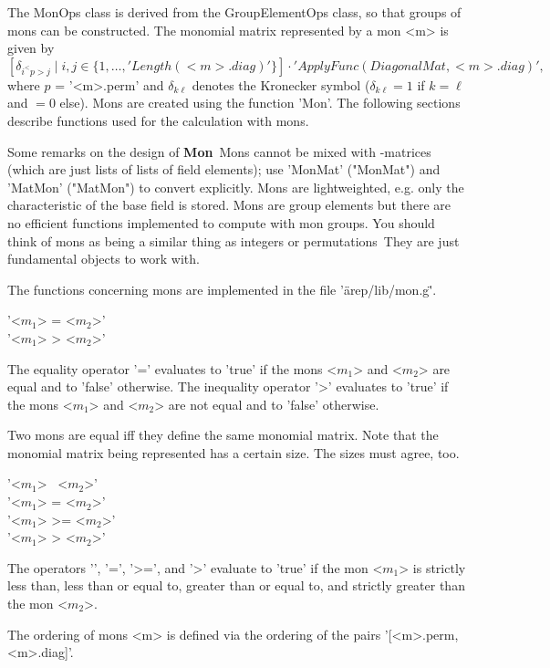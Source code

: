 The MonOps class is derived from the GroupElementOps class, 
so that groups of mons can be constructed. The monomial matrix
represented by a mon <m> is given by
$$
[\delta_{i^<p>j}\mid i,j\in\{1,\dots,'Length( <m>.diag )'\}]\cdot 
'ApplyFunc(DiagonalMat, <m>.diag )',
$$
where $p$ = '<m>.perm' and $\delta_{k\ell}$ denotes the 
Kronecker symbol ($\delta_{k\ell} = 1$ if $k = \ell$ and $= 0$ else). 
Mons are 
created using the function 'Mon'. The following sections describe 
functions used for the calculation with mons.

Some remarks on the design of {\bf Mon}\:\ Mons cannot be mixed 
with {\GAP}-matrices (which are just lists of lists of field
elements); use 'MonMat' ("MonMat") and 'MatMon' ("MatMon") to convert
explicitly. Mons are lightweighted, e.g. only the characteristic of
the base field is stored.  Mons are group elements but there are no
efficient functions implemented to compute with mon groups. You should
think of mons as being a similar thing as integers or permutations\:\
They are just fundamental objects to work with.

The functions concerning mons are implemented in the file 
'\"arep/lib/mon.g\"'.

\Section{Comparison of Mons}%
%

'<$m_1$> = <$m_2$>' \\
'<$m_1$> \<> <$m_2$>'

The equality operator '=' evaluates to 'true'  if the mons <$m_1$>
and <$m_2$> are  equal and  to 'false' otherwise. The  inequality operator
'\<>' evaluates to 'true' if the mons <$m_1$> and <$m_2$> are not equal
and to 'false' otherwise.

Two mons are equal iff they define the same monomial matrix. Note
that the monomial matrix being represented has a certain size. The
sizes must agree, too.

\bigskip
'<$m_1$> \<\ <$m_2$>' \\
'<$m_1$> \<= <$m_2$>' \\
'<$m_1$> >= <$m_2$>' \\
'<$m_1$> > <$m_2$>'

The operators '\<', '\<=', '>=', and '>' evaluate to 'true' if the 
mon <$m_1$> is strictly less than, less than or equal to, greater than or
equal to, and strictly greater than the mon <$m_2$>. 

The ordering of mons <m> is defined via the ordering 
of the pairs '[<m>.perm, <m>.diag]'.

